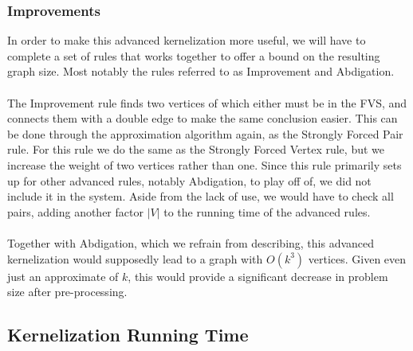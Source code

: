 \subsubsection{Improvements}
In order to make this advanced kernelization more useful, we will have to complete a set of rules that works together to offer a bound on the resulting graph size. Most notably the rules referred to as Improvement and Abdigation. \\\\
The Improvement rule finds two vertices of which either must be in the FVS, and connects them with a double edge to make the same conclusion easier. This can be done through the approximation algorithm again, as the Strongly Forced Pair rule. For this rule we do the same as the Strongly Forced Vertex rule, but we increase the weight of two vertices rather than one. Since this rule primarily sets up for other advanced rules, notably Abdigation, to play off of, we did not include it in the system. Aside from the lack of use, we would have to check all pairs, adding another factor $|V|$ to the running time of the advanced rules.\\\\
Together with Abdigation, which we refrain from describing, this advanced kernelization would supposedly lead to a graph with $O(k^3)$ vertices. Given even just an approximate of $k$, this would provide a significant decrease in problem size after pre-processing.

\subsection{Kernelization Running Time} %

